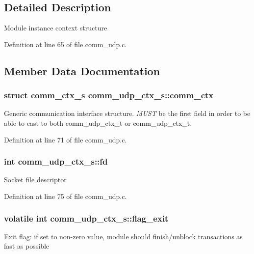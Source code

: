 \subsection{Detailed Description}
Module instance context structure 

Definition at line 65 of file comm\+\_\+udp.\+c.



\subsection{Member Data Documentation}
\subsubsection[{\texorpdfstring{comm\+\_\+ctx}{comm_ctx}}]{\setlength{\rightskip}{0pt plus 5cm}struct {\bf comm\+\_\+ctx\+\_\+s} comm\+\_\+udp\+\_\+ctx\+\_\+s\+::comm\+\_\+ctx}\hypertarget{structcomm__udp__ctx__s_a3732c33a70c43d9f270ab912cc23d94b}{}\label{structcomm__udp__ctx__s_a3732c33a70c43d9f270ab912cc23d94b}
Generic communication interface structure. {\itshape M\+U\+ST} be the first field in order to be able to cast to both comm\+\_\+udp\+\_\+ctx\+\_\+t or comm\+\_\+udp\+\_\+ctx\+\_\+t. 

Definition at line 71 of file comm\+\_\+udp.\+c.

\subsubsection[{\texorpdfstring{fd}{fd}}]{\setlength{\rightskip}{0pt plus 5cm}int comm\+\_\+udp\+\_\+ctx\+\_\+s\+::fd}\hypertarget{structcomm__udp__ctx__s_a65be1c0c98d73e09419c3507a4c4535b}{}\label{structcomm__udp__ctx__s_a65be1c0c98d73e09419c3507a4c4535b}
Socket file descriptor 

Definition at line 75 of file comm\+\_\+udp.\+c.

\subsubsection[{\texorpdfstring{flag\+\_\+exit}{flag_exit}}]{\setlength{\rightskip}{0pt plus 5cm}volatile int comm\+\_\+udp\+\_\+ctx\+\_\+s\+::flag\+\_\+exit}\hypertarget{structcomm__udp__ctx__s_a3478e148fc2c7e2a11d0ecf1f064ad27}{}\label{structcomm__udp__ctx__s_a3478e148fc2c7e2a11d0ecf1f064ad27}
Exit flag\+: if set to non-\/zero value, module should finish/unblock transactions as fast as possible 


